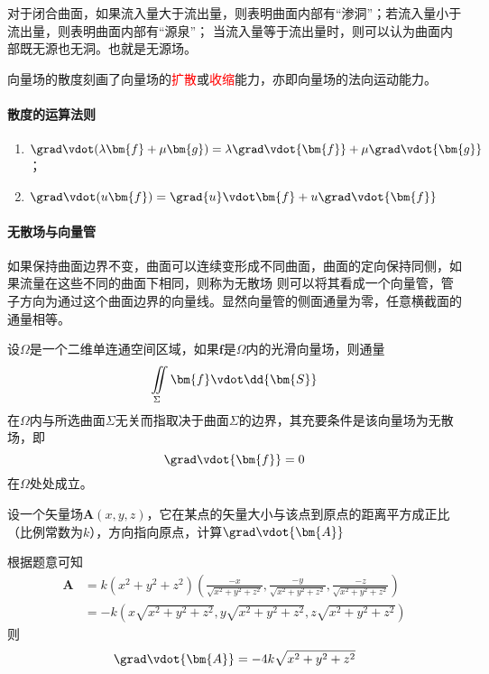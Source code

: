 对于闭合曲面，如果流入量大于流出量，则表明曲面内部有“渗洞”；若流入量小于流出量，则表明曲面内部有“源泉”；
当流入量等于流出量时，则可以认为曲面内部既无源也无洞。也就是无源场。

向量场的散度刻画了向量场的\textcolor{red}{扩散}或\textcolor{red}{收缩}能力，亦即向量场的法向运动能力。

\paragraph{散度的运算法则}
\begin{enumerate}[(1)]
    \item $\grad\vdot(\lambda\bm{f}+\mu\bm{g})=\lambda\grad\vdot{\bm{f}} + \mu\grad\vdot{\bm{g}}$；
    \item $\grad\vdot(u\bm{f})=\grad{u}\vdot\bm{f} + u\grad\vdot{\bm{f}}$
\end{enumerate}

\paragraph{无散场与向量管}
如果保持曲面边界不变，曲面可以连续变形成不同曲面，曲面的定向保持同侧，如果流量在这些不同的曲面下相同，则称为无散场
则可以将其看成一个向量管，管子方向为通过这个曲面边界的向量线。显然向量管的侧面通量为零，任意横截面的通量相等。

\begin{theorem}
    设$\Omega$是一个二维单连通空间区域，如果$\bm{f}$是$\Omega$内的光滑向量场，则通量
    \[ \iint\limits_\Sigma \bm{f}\vdot\dd{\bm{S}} \]
    在$\Omega$内与所选曲面$\Sigma$无关而指取决于曲面$\Sigma$的边界，其充要条件是该向量场为无散场，即
    \[ \grad\vdot{\bm{f}} = 0 \]
    在$\Omega$处处成立。
\end{theorem}

\begin{example}
    设一个矢量场$\bm{A}(x,y,z)$，它在某点的矢量大小与该点到原点的距离平方成正比（比例常数为$k$），方向指向原点，计算$\grad\vdot{\bm{A}}$
\end{example}
\begin{solution}
    根据题意可知
    \begin{align*}
        \bm{A} & =k(x^2+y^2+z^2)(\frac{-x}{\sqrt{x^2+y^2+z^2}},\frac{-y}{\sqrt{x^2+y^2+z^2}},\frac{-z}{\sqrt{x^2+y^2+z^2}}) \\
               & = -k(x\sqrt{x^2+y^2+z^2},y\sqrt{x^2+y^2+z^2},z\sqrt{x^2+y^2+z^2})
    \end{align*}
    则
    \[ \grad\vdot{\bm{A}} = -4k\sqrt{x^2+y^2+z^2} \]
\end{solution}

